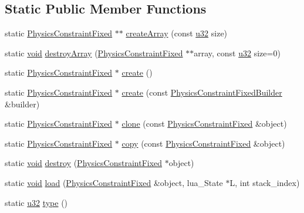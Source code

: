 \subsection*{Static Public Member Functions}
\begin{DoxyCompactItemize}
\item 
static \mbox{\hyperlink{classnjli_1_1_physics_constraint_fixed}{Physics\+Constraint\+Fixed}} $\ast$$\ast$ \mbox{\hyperlink{classnjli_1_1_physics_constraint_fixed_ab81f24e0e128e347f7fa152d54877803}{create\+Array}} (const \mbox{\hyperlink{_util_8h_a10e94b422ef0c20dcdec20d31a1f5049}{u32}} size)
\item 
static \mbox{\hyperlink{_thread_8h_af1e856da2e658414cb2456cb6f7ebc66}{void}} \mbox{\hyperlink{classnjli_1_1_physics_constraint_fixed_a2d9b9e229cb4b85b1143f0e3be7249dd}{destroy\+Array}} (\mbox{\hyperlink{classnjli_1_1_physics_constraint_fixed}{Physics\+Constraint\+Fixed}} $\ast$$\ast$array, const \mbox{\hyperlink{_util_8h_a10e94b422ef0c20dcdec20d31a1f5049}{u32}} size=0)
\item 
static \mbox{\hyperlink{classnjli_1_1_physics_constraint_fixed}{Physics\+Constraint\+Fixed}} $\ast$ \mbox{\hyperlink{classnjli_1_1_physics_constraint_fixed_a871ec2fb30520315e5b94f903919bf6c}{create}} ()
\item 
static \mbox{\hyperlink{classnjli_1_1_physics_constraint_fixed}{Physics\+Constraint\+Fixed}} $\ast$ \mbox{\hyperlink{classnjli_1_1_physics_constraint_fixed_ac4aa0710e8762196ec38512ef92a464d}{create}} (const \mbox{\hyperlink{classnjli_1_1_physics_constraint_fixed_builder}{Physics\+Constraint\+Fixed\+Builder}} \&builder)
\item 
static \mbox{\hyperlink{classnjli_1_1_physics_constraint_fixed}{Physics\+Constraint\+Fixed}} $\ast$ \mbox{\hyperlink{classnjli_1_1_physics_constraint_fixed_a842878b76d7f66ae80e7a9244b12d5a2}{clone}} (const \mbox{\hyperlink{classnjli_1_1_physics_constraint_fixed}{Physics\+Constraint\+Fixed}} \&object)
\item 
static \mbox{\hyperlink{classnjli_1_1_physics_constraint_fixed}{Physics\+Constraint\+Fixed}} $\ast$ \mbox{\hyperlink{classnjli_1_1_physics_constraint_fixed_a3955cdd659159c1de1c7a015304e173e}{copy}} (const \mbox{\hyperlink{classnjli_1_1_physics_constraint_fixed}{Physics\+Constraint\+Fixed}} \&object)
\item 
static \mbox{\hyperlink{_thread_8h_af1e856da2e658414cb2456cb6f7ebc66}{void}} \mbox{\hyperlink{classnjli_1_1_physics_constraint_fixed_a2c2cceb0946d76136247a9b5bc2ce850}{destroy}} (\mbox{\hyperlink{classnjli_1_1_physics_constraint_fixed}{Physics\+Constraint\+Fixed}} $\ast$object)
\item 
static \mbox{\hyperlink{_thread_8h_af1e856da2e658414cb2456cb6f7ebc66}{void}} \mbox{\hyperlink{classnjli_1_1_physics_constraint_fixed_a80035a24ccca3f5b3888646059ba8c13}{load}} (\mbox{\hyperlink{classnjli_1_1_physics_constraint_fixed}{Physics\+Constraint\+Fixed}} \&object, lua\+\_\+\+State $\ast$L, int stack\+\_\+index)
\item 
static \mbox{\hyperlink{_util_8h_a10e94b422ef0c20dcdec20d31a1f5049}{u32}} \mbox{\hyperlink{classnjli_1_1_physics_constraint_fixed_ab1ebf178433c9cd51d07e85a58aed16c}{type}} ()
\end{DoxyCompactItemize}
